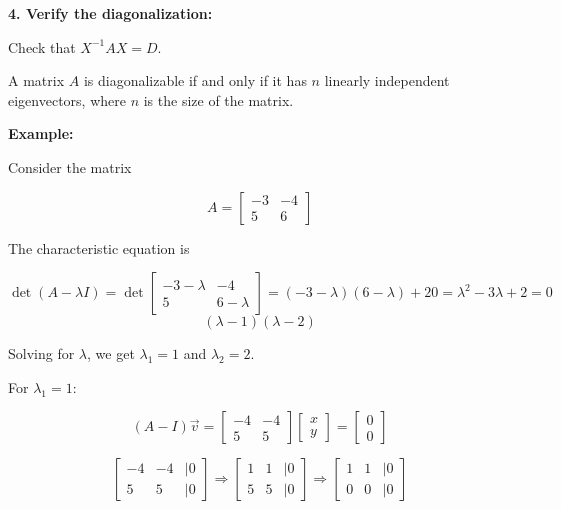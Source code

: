 \textbf{4. Verify the diagonalization:}
    
Check that \(X^{-1}AX = D\).

A matrix \(A\) is diagonalizable if and only if it has \(n\) linearly independent eigenvectors, where 
\(n\) is the size of the matrix.

\textbf{Example: }

Consider the matrix

\[
    A = \begin{bmatrix}
    -3 & -4 \\
    5 & 6
    \end{bmatrix}
\]

The characteristic equation is

\[
    \det(A - \lambda I) 
    = \det 
    \begin{bmatrix}
            -3 - \lambda & -4 \\
        5 & 6 - \lambda
    \end{bmatrix} 
    = (-3 - \lambda)(6 - \lambda) + 20 = \lambda^2 - 3\lambda + 2 = 0    
\]
\[
    (\lambda - 1)(\lambda - 2)
\]

Solving for \(\lambda\), we get \(\lambda_1 = 1\) and \(\lambda_2 = 2\).

For \(\lambda_1 = 1\):

\[
   (A - I)\vec{v} = \begin{bmatrix}
    -4 & -4 \\
    5 & 5
    \end{bmatrix} \begin{bmatrix}
    x \\
    y
    \end{bmatrix} = \begin{bmatrix}
    0 \\
    0
    \end{bmatrix}
\]

\[
    \begin{bmatrix}
    -4 & -4 & \mid  0\\
    5 & 5   & \mid  0
    \end{bmatrix} 
    \Rightarrow
    \begin{bmatrix}
    1 & 1 & \mid  0\\
    5 & 5 & \mid  0
    \end{bmatrix}
    \Rightarrow
    \begin{bmatrix}
    1 & 1 & \mid  0\\
    0 & 0   & \mid  0
    \end{bmatrix}
\]    

